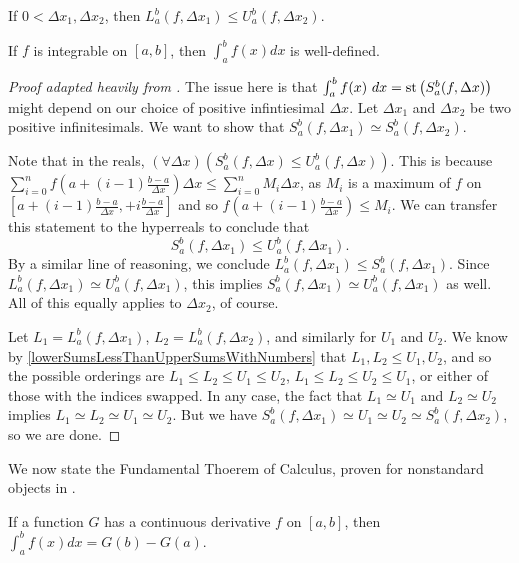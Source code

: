 \begin{corollary}\label{lowerSumsLessThanUpperSumsWithNumbers}
    If $0 < \Delta x_1, \Delta x_2$, then $L_a^b(f, \Delta x_1) \leq U_a^b(f, \Delta x_2)$.
\end{corollary}

\begin{thm}
    If $f$ is integrable on $[a, b]$, then $\int_a^b f(x)dx$ is well-defined.
\end{thm}

\begin{proof}[Proof adapted heavily from ]
    The issue here is that $\int_a^b f(x)\ dx = \operatorname{st}\left(S_a^b(f, \Delta x)\right)$ might depend on our choice of positive infintiesimal $\Delta x$. Let $\Delta x_1$ and $\Delta x_2$ be two positive infinitesimals. We want to show that $S_a^b(f, \Delta x_1) \simeq S_a^b(f, \Delta x_2)$.

    Note that in the reals, $(\forall \Delta x)(S_a^b(f, \Delta x) \leq U_a^b(f, \Delta x))$. This is because $\sum_{i=0}^n f(a + (i-1)\frac{b-a}{\Delta x})\Delta x \leq \sum_{i=0}^n M_i \Delta x$, as $M_i$ is a maximum of $f$ on $[a + (i-1)\frac{b-a}{\Delta x},  + i\frac{b-a}{\Delta x}]$ and so $f(a + (i-1)\frac{b-a}{\Delta x}) \leq M_i$. We can transfer this statement to the hyperreals to conclude that 
    \[ 
    S_a^b(f, \Delta x_1) \leq U_a^b(f, \Delta x_1).
    \] 
    By a similar line of reasoning, we conclude $L_a^b(f, \Delta x_1) \leq S_a^b(f, \Delta x_1)$. Since $L_a^b(f, \Delta x_1) \simeq U_a^b(f, \Delta x_1)$, this implies $S_a^b(f, \Delta x_1) \simeq U_a^b(f, \Delta x_1)$ as well. All of this equally applies to $\Delta x_2$, of course.

    Let $L_1 = L_a^b(f, \Delta x_1)$, $L_2 = L_a^b(f, \Delta x_2)$, and similarly for $U_1$ and $U_2$. We know by \autoref{lowerSumsLessThanUpperSumsWithNumbers} that $L_1, L_2 \leq U_1, U_2$, and so the possible orderings are $L_1 \leq L_2 \leq U_1 \leq U_2$, $L_1 \leq L_2 \leq U_2 \leq U_1$, or either of those with the indices swapped. In any case, the fact that $L_1 \simeq U_1$ and $L_2 \simeq U_2$ implies $L_1 \simeq L_2 \simeq U_1 \simeq U_2$. But we have $S_a^b(f, \Delta x_1) \simeq U_1 \simeq U_2 \simeq S_a^b(f, \Delta x_2)$, so we are done.
\end{proof}

We now state the Fundamental Thoerem of Calculus, proven for nonstandard objects in \cite[111-112]{goldblatt1998}. 

\begin{thm}\label{fundamentalTheoremCalculus}
    If a function $G$ has a continuous derivative $f$ on $[a, b]$, then $\int_a^b f(x) dx = G(b) - G(a)$.
\end{thm}


